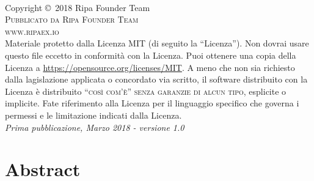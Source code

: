 \documentclass[11pt,fleqn]{book} %
\begin{document}
\begingroup
\thispagestyle{empty}
\endgroup

\newpage
~\vfill
\thispagestyle{empty}

\noindent Copyright \copyright\ 2018 Ripa Founder Team\\ %

\noindent \textsc{Pubblicato da Ripa Founder Team}\\ %

\noindent \textsc{www.ripaex.io}\\ %

\noindent Materiale protetto dalla Licenza MIT (di seguito la ``Licenza''). Non dovrai usare questo file eccetto in conformità con la Licenza. Puoi ottenere una copia della Licenza a \url{https://opensource.org/licenses/MIT}. A meno che non sia richiesto dalla lagislazione applicata o concordato via scritto, il software distribuito con la Licenza è distribuito \textsc{``così com'è'' senza garanzie di alcun tipo}, esplicite o implicite. Fate riferimento alla Licenza per il linguaggio specifico che governa i permessi e le limitazione indicati dalla Licenza.\\ 

\noindent \textit{Prima pubblicazione, Marzo 2018 - versione 1.0} %

\pagestyle{empty} %
\usechapterimagefalse %
\chapter{Abstract}
\end{document}
